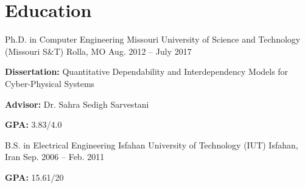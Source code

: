 \section{Education}
\begin{cventries}
  \cventry
    {Ph.D. in Computer Engineering}
    {Missouri University of Science and Technology (Missouri S\&T)}
    {Rolla, MO}
    {Aug. 2012 -- July 2017}
    {
      \begin{cvitems}
        \ifcv
          \item \textbf{Dissertation:} Quantitative Dependability and Interdependency Models for Cyber-Physical Systems
          \item \textbf{Advisor:} Dr. Sahra Sedigh Sarvestani
        \fi
        \item \textbf{GPA:} 3.83/4.0
      \end{cvitems}
    }
  \cventry
    {B.S. in Electrical Engineering}
    {Isfahan University of Technology (IUT)}
    {Isfahan, Iran}
    {Sep. 2006 -- Feb. 2011}
    {
      \begin{cvitems}
        \item \textbf{GPA:} 15.61/20
      \end{cvitems}
    }
\end{cventries} 